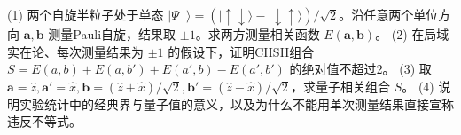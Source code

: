 (1) 两个自旋半粒子处于单态 \(|\Psi^-\rangle=(|\uparrow\downarrow\rangle-|\downarrow\uparrow\rangle)/\sqrt2\)。沿任意两个单位方向 \(\mathbf a,\mathbf b\) 测量Pauli自旋，结果取 \(\pm1\)。求两方测量相关函数 \(E(\mathbf a,\mathbf b)\)。
(2) 在局域实在论、每次测量结果为 \(\pm1\) 的假设下，证明CHSH组合 \(S=E(a,b)+E(a,b')+E(a',b)-E(a',b')\) 的绝对值不超过2。
(3) 取 \(\mathbf a=\hat z,\mathbf a'=\hat x,\mathbf b=(\hat z+\hat x)/\sqrt2,\mathbf b'=(\hat z-\hat x)/\sqrt2\)，求量子相关组合 \(S\)。
(4) 说明实验统计中的经典界与量子值的意义，以及为什么不能用单次测量结果直接宣称违反不等式。
